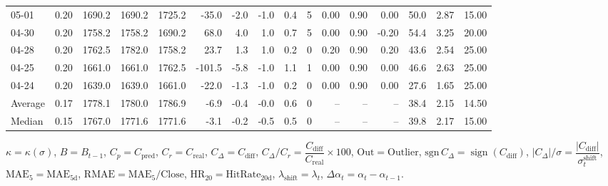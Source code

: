 \begin{threeparttable}
{\begin{tabular}{lrrrrrrrrrrrrrrr}
  05-01 &     0.20 & 1690.2 & 1690.2 & 1725.2 &      -35.0 &           -2.0 &                     -1.0 &                 0.4 &              5 &       0.00 &      0.90 &           0.00 &             50.0 &            2.87 &                  15.00 \\
  04-30 &     0.20 & 1758.2 & 1758.2 & 1690.2 &       68.0 &            4.0 &                      1.0 &                 0.7 &              5 &       0.00 &      0.90 &          -0.20 &             54.4 &            3.25 &                  20.00 \\
  04-28 &     0.20 & 1762.5 & 1782.0 & 1758.2 &       23.7 &            1.3 &                      1.0 &                 0.2 &              0 &       0.20 &      0.90 &           0.20 &             43.6 &            2.54 &                  25.00 \\
  04-25 &     0.20 & 1661.0 & 1661.0 & 1762.5 &     -101.5 &           -5.8 &                     -1.0 &                 1.1 &              1 &       0.00 &      0.90 &           0.00 &             46.6 &            2.63 &                  25.00 \\
  04-24 &     0.20 & 1639.0 & 1639.0 & 1661.0 &      -22.0 &           -1.3 &                     -1.0 &                 0.2 &              0 &       0.00 &      0.90 &           0.00 &             27.6 &            1.65 &                  25.00 \\
Average &     0.17 & 1778.1 & 1780.0 & 1786.9 &       -6.9 &           -0.4 &                     -0.0 &                 0.6 &              0 &         -- &        -- &             -- &             38.4 &            2.15 &                  14.50 \\
 Median &     0.15 & 1767.0 & 1771.6 & 1771.6 &       -3.1 &           -0.2 &                     -0.5 &                 0.5 &              0 &         -- &        -- &             -- &             39.8 &            2.17 &                  15.00 \\
\bottomrule
\end{tabular}
}
\begin{tablenotes}\footnotesize
\item $\kappa=\kappa(\sigma)$, $B=B_{t-1}$, $C_p=C_{\text{pred}}$, $C_r=C_{\text{real}}$, $C_\Delta=C_{\text{diff}}$, $C_\Delta/C_r=\dfrac{C_{\text{diff}}}{C_{\text{real}}}\times100$, $\mathrm{Out}=\text{Outlier}$, $\mathrm{sgn}\,C_\Delta=\operatorname{sign}(C_{\text{diff}})$, $|C_\Delta|/\sigma=\dfrac{|C_{\text{diff}}|}{\sigma_t^{\text{shift}}}$, $\mathrm{MAE}_5=\mathrm{MAE}_{5\text{d}}$, $\mathrm{RMAE}= \mathrm{MAE}_5 / \text{Close}$, $\mathrm{HR}_{20}=\mathrm{HitRate}_{20\text{d}}$, 
$\lambda_{\text{shift}}=\lambda_t$, 
$\Delta\alpha_t=\alpha_t-\alpha_{t-1}$.
\end{tablenotes}
\end{threeparttable}
\endgroup

